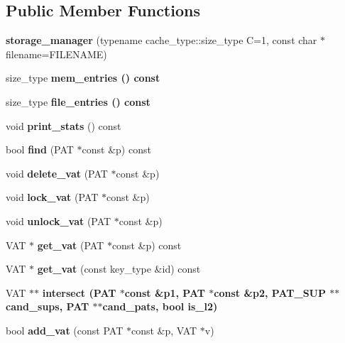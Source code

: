 \subsection*{Public Member Functions}
\begin{CompactItemize}
\item 
\textbf{storage\_\-manager} (typename cache\_\-type::size\_\-type C=1, const char $\ast$filename=FILENAME)\label{classstorage__manager_3_01PAT_00_01VAT_00_01ALLOC_00_01file__storage_01_4_c11c1061cb1bf5e1b2f0066ecd6b9af2}

\item 
size\_\-type \bf{mem\_\-entries} () const 
\item 
size\_\-type \bf{file\_\-entries} () const 
\item 
void \textbf{print\_\-stats} () const \label{classstorage__manager_3_01PAT_00_01VAT_00_01ALLOC_00_01file__storage_01_4_d50c8fff9eb678168cb8ebdcc8940d3c}

\item 
bool \textbf{find} (PAT $\ast$const \&p) const \label{classstorage__manager_3_01PAT_00_01VAT_00_01ALLOC_00_01file__storage_01_4_8f319ac8f99221706ad35066010eb18f}

\item 
void \textbf{delete\_\-vat} (PAT $\ast$const \&p)\label{classstorage__manager_3_01PAT_00_01VAT_00_01ALLOC_00_01file__storage_01_4_8d434650a47fdd7269ca5608e5663df8}

\item 
void \textbf{lock\_\-vat} (PAT $\ast$const \&p)\label{classstorage__manager_3_01PAT_00_01VAT_00_01ALLOC_00_01file__storage_01_4_2dda6ec63f036a38021d9d0d6436d33b}

\item 
void \textbf{unlock\_\-vat} (PAT $\ast$const \&p)\label{classstorage__manager_3_01PAT_00_01VAT_00_01ALLOC_00_01file__storage_01_4_5709479955550cc396cb07c958d68e76}

\item 
VAT $\ast$ \textbf{get\_\-vat} (PAT $\ast$const \&p) const \label{classstorage__manager_3_01PAT_00_01VAT_00_01ALLOC_00_01file__storage_01_4_abc0138265c7d2e4f7a4592ec06ef02b}

\item 
VAT $\ast$ \textbf{get\_\-vat} (const key\_\-type \&id) const \label{classstorage__manager_3_01PAT_00_01VAT_00_01ALLOC_00_01file__storage_01_4_0288b8c81f60f6a118f5ea3313466963}

\item 
VAT $\ast$$\ast$ \bf{intersect} (PAT $\ast$const \&p1, PAT $\ast$const \&p2, \bf{PAT\_\-SUP} $\ast$$\ast$cand\_\-sups, PAT $\ast$$\ast$cand\_\-pats, bool is\_\-l2)
\item 
bool \textbf{add\_\-vat} (const PAT $\ast$const \&p, VAT $\ast$v)\label{classstorage__manager_3_01PAT_00_01VAT_00_01ALLOC_00_01file__storage_01_4_386897c425b503203e4290d820af6d7b}


\end{CompactItemize}
